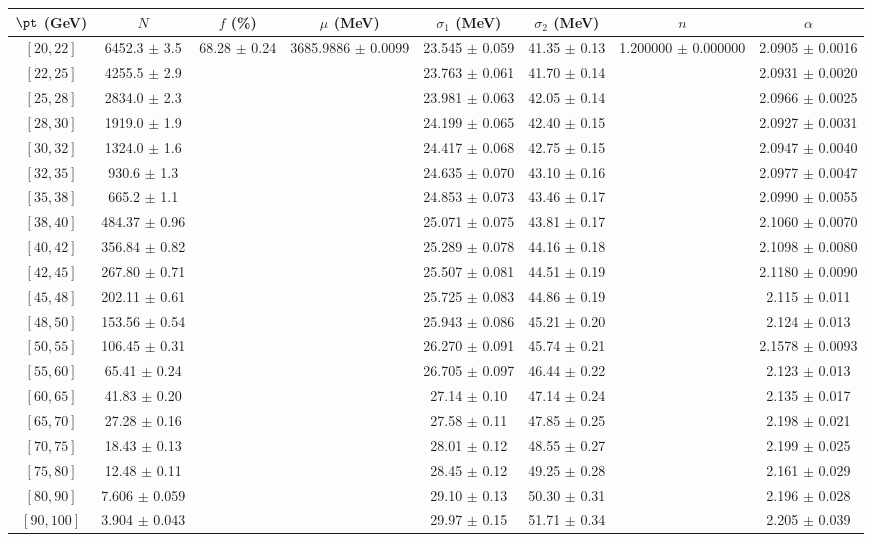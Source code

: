 \begin{tabular}{c||c|c|c|c|c|c|c}
$\pt$ (GeV) & $N$ & $f$ (\%) & $\mu$ (MeV) & $\sigma_1$ (MeV) & $\sigma_2$ (MeV) & $n$ & $\alpha$ \\
\hline
$[20, 22]$ & 6452.3 $\pm$ 3.5 & \multirow{20}{*}{68.28 $\pm$ 0.24} & \multirow{20}{*}{3685.9886 $\pm$ 0.0099} & 23.545 $\pm$ 0.059 & 41.35 $\pm$ 0.13 & \multirow{20}{*}{1.200000 $\pm$ 0.000000} & 2.0905 $\pm$ 0.0016\\
$[22, 25]$ & 4255.5 $\pm$ 2.9 &  &  & 23.763 $\pm$ 0.061 & 41.70 $\pm$ 0.14 &  & 2.0931 $\pm$ 0.0020\\
$[25, 28]$ & 2834.0 $\pm$ 2.3 &  &  & 23.981 $\pm$ 0.063 & 42.05 $\pm$ 0.14 &  & 2.0966 $\pm$ 0.0025\\
$[28, 30]$ & 1919.0 $\pm$ 1.9 &  &  & 24.199 $\pm$ 0.065 & 42.40 $\pm$ 0.15 &  & 2.0927 $\pm$ 0.0031\\
$[30, 32]$ & 1324.0 $\pm$ 1.6 &  &  & 24.417 $\pm$ 0.068 & 42.75 $\pm$ 0.15 &  & 2.0947 $\pm$ 0.0040\\
$[32, 35]$ & 930.6 $\pm$ 1.3 &  &  & 24.635 $\pm$ 0.070 & 43.10 $\pm$ 0.16 &  & 2.0977 $\pm$ 0.0047\\
$[35, 38]$ & 665.2 $\pm$ 1.1 &  &  & 24.853 $\pm$ 0.073 & 43.46 $\pm$ 0.17 &  & 2.0990 $\pm$ 0.0055\\
$[38, 40]$ & 484.37 $\pm$ 0.96 &  &  & 25.071 $\pm$ 0.075 & 43.81 $\pm$ 0.17 &  & 2.1060 $\pm$ 0.0070\\
$[40, 42]$ & 356.84 $\pm$ 0.82 &  &  & 25.289 $\pm$ 0.078 & 44.16 $\pm$ 0.18 &  & 2.1098 $\pm$ 0.0080\\
$[42, 45]$ & 267.80 $\pm$ 0.71 &  &  & 25.507 $\pm$ 0.081 & 44.51 $\pm$ 0.19 &  & 2.1180 $\pm$ 0.0090\\
$[45, 48]$ & 202.11 $\pm$ 0.61 &  &  & 25.725 $\pm$ 0.083 & 44.86 $\pm$ 0.19 &  & 2.115 $\pm$ 0.011\\
$[48, 50]$ & 153.56 $\pm$ 0.54 &  &  & 25.943 $\pm$ 0.086 & 45.21 $\pm$ 0.20 &  & 2.124 $\pm$ 0.013\\
$[50, 55]$ & 106.45 $\pm$ 0.31 &  &  & 26.270 $\pm$ 0.091 & 45.74 $\pm$ 0.21 &  & 2.1578 $\pm$ 0.0093\\
$[55, 60]$ & 65.41 $\pm$ 0.24 &  &  & 26.705 $\pm$ 0.097 & 46.44 $\pm$ 0.22 &  & 2.123 $\pm$ 0.013\\
$[60, 65]$ & 41.83 $\pm$ 0.20 &  &  & 27.14 $\pm$ 0.10 & 47.14 $\pm$ 0.24 &  & 2.135 $\pm$ 0.017\\
$[65, 70]$ & 27.28 $\pm$ 0.16 &  &  & 27.58 $\pm$ 0.11 & 47.85 $\pm$ 0.25 &  & 2.198 $\pm$ 0.021\\
$[70, 75]$ & 18.43 $\pm$ 0.13 &  &  & 28.01 $\pm$ 0.12 & 48.55 $\pm$ 0.27 &  & 2.199 $\pm$ 0.025\\
$[75, 80]$ & 12.48 $\pm$ 0.11 &  &  & 28.45 $\pm$ 0.12 & 49.25 $\pm$ 0.28 &  & 2.161 $\pm$ 0.029\\
$[80, 90]$ & 7.606 $\pm$ 0.059 &  &  & 29.10 $\pm$ 0.13 & 50.30 $\pm$ 0.31 &  & 2.196 $\pm$ 0.028\\
$[90, 100]$ & 3.904 $\pm$ 0.043 &  &  & 29.97 $\pm$ 0.15 & 51.71 $\pm$ 0.34 &  & 2.205 $\pm$ 0.039\\
\end{tabular}
